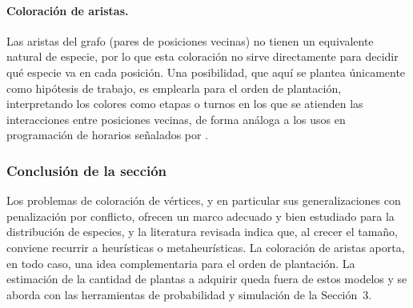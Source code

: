 \documentclass[11pt]{article}
\begin{document}
\paragraph{Coloración de aristas.} Las aristas del grafo (pares de posiciones vecinas) no tienen un equivalente natural de especie, por lo que esta coloración no sirve directamente para decidir qué especie va en cada posición. Una posibilidad, que aquí se plantea únicamente como hipótesis de trabajo, es emplearla para el orden de plantación, interpretando los colores como etapas o turnos en los que se atienden las interacciones entre posiciones vecinas, de forma análoga a los usos en programación de horarios señalados por \textcite{dewerra2015}.

\subsubsection{Conclusión de la sección}

Los problemas de coloración de vértices, y en particular sus generalizaciones con penalización por conflicto, ofrecen un marco adecuado y bien estudiado para la distribución de especies, y la literatura revisada indica que, al crecer el tamaño, conviene recurrir a heurísticas o metaheurísticas. La coloración de aristas aporta, en todo caso, una idea complementaria para el orden de plantación. La estimación de la cantidad de plantas a adquirir queda fuera de estos modelos y se aborda con las herramientas de probabilidad y simulación de la Sección~3.

\printbibliography
\end{document}
